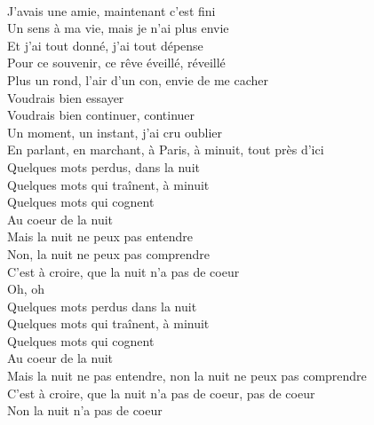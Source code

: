 \\
J'avais une amie, maintenant c'est fini \\
Un sens à ma vie, mais je n'ai plus envie \\
Et j'ai tout donné, j'ai tout dépense \\
Pour ce souvenir, ce rêve éveillé, réveillé \\
Plus un rond, l'air d'un con, envie de me cacher \\
Voudrais bien essayer \\
Voudrais bien continuer, continuer \\
Un moment, un instant, j'ai cru oublier \\
En parlant, en marchant, à Paris, à minuit, tout près d'ici \\
Quelques mots perdus, dans la nuit \\
Quelques mots qui traînent, à minuit \\
Quelques mots qui cognent \\
Au coeur de la nuit \\
Mais la nuit ne peux pas entendre \\
Non, la nuit ne peux pas comprendre \\
C'est à croire, que la nuit n'a pas de coeur \\
Oh, oh \\
Quelques mots perdus dans la nuit \\
Quelques mots qui traînent, à minuit \\
Quelques mots qui cognent \\
Au coeur de la nuit \\
Mais la nuit ne pas entendre, non la nuit ne peux pas comprendre \\
C'est à croire, que la nuit n'a pas de coeur, pas de coeur \\
Non la nuit n'a pas de coeur \\
